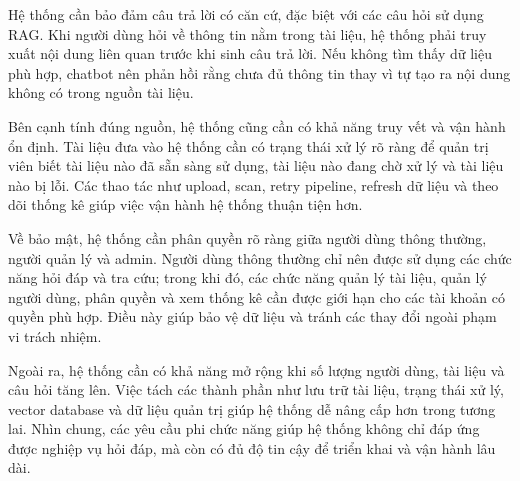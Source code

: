 Hệ thống cần bảo đảm câu trả lời có căn cứ, đặc biệt với các câu hỏi sử dụng RAG. Khi người dùng hỏi về thông tin nằm trong tài liệu, hệ thống phải truy xuất nội dung liên quan trước khi sinh câu trả lời. Nếu không tìm thấy dữ liệu phù hợp, chatbot nên phản hồi rằng chưa đủ thông tin thay vì tự tạo ra nội dung không có trong nguồn tài liệu.

Bên cạnh tính đúng nguồn, hệ thống cũng cần có khả năng truy vết và vận hành ổn định. Tài liệu đưa vào hệ thống cần có trạng thái xử lý rõ ràng để quản trị viên biết tài liệu nào đã sẵn sàng sử dụng, tài liệu nào đang chờ xử lý và tài liệu nào bị lỗi. Các thao tác như upload, scan, retry pipeline, refresh dữ liệu và theo dõi thống kê giúp việc vận hành hệ thống thuận tiện hơn.

Về bảo mật, hệ thống cần phân quyền rõ ràng giữa người dùng thông thường, người quản lý và admin. Người dùng thông thường chỉ nên được sử dụng các chức năng hỏi đáp và tra cứu; trong khi đó, các chức năng quản lý tài liệu, quản lý người dùng, phân quyền và xem thống kê cần được giới hạn cho các tài khoản có quyền phù hợp. Điều này giúp bảo vệ dữ liệu và tránh các thay đổi ngoài phạm vi trách nhiệm.

Ngoài ra, hệ thống cần có khả năng mở rộng khi số lượng người dùng, tài liệu và câu hỏi tăng lên. Việc tách các thành phần như lưu trữ tài liệu, trạng thái xử lý, vector database và dữ liệu quản trị giúp hệ thống dễ nâng cấp hơn trong tương lai. Nhìn chung, các yêu cầu phi chức năng giúp hệ thống không chỉ đáp ứng được nghiệp vụ hỏi đáp, mà còn có đủ độ tin cậy để triển khai và vận hành lâu dài.
